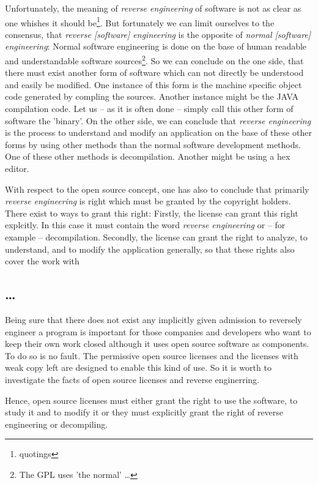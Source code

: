 Unfortunately, the meaning of \emph{reverse engineering} of software is not as
clear as one whishes it should be\footnote{quotings}. But fortunately we can
limit ourselves to the consensus, that \emph{reverse [software] engineering} is
the opposite of \emph{normal [software] engineering}: Normal software
engineering is done on the base of human readable and understandable software
sources\footnote{The GPL uses 'the normal' \ldots}. So we can conclude on the
one side, that there must exist another form of software which can not directly be
understood and easily be modified. One instance of this form is the machine
specific object code generated by compling the sources. Another instance might
be the JAVA compilation code. Let us -- as it is often done -- simply call this
other form of software the 'binary'. On the other side, we can conclude that
\emph{reverse engineering} is the process to understand and modify an application on the base of these other forms by using other methods than the normal software development
methods. One of these other methods is decompilation. Another might be using a
hex editor.

With respect to the open source concept, one has also to conclude that primarily
\emph{reverse engineering} is right which must be granted by the copyright
holders. There exist to ways to grant this right: Firstly, the license can grant
this right explcitly. In this case it must contain the word \emph{reverse
engineering} or -- for example -- decompilation. Secondly, the license can grant
the right to analyze, to understand, and to modify the application generally, so
that these rights also cover the work with

\subsection{\ldots}

Being sure that there does not exist any implicitly given admission to reversely
engineer a program is important for those companies and developers who want to
keep their own work closed although it uses open source software as components.
To do so is no fault. The permissive open source licenses and the licenses with
weak copy left are designed to enable this kind of use. So it is worth to
investigate the facts of open source licenses and reverse enginerring.



Hence, open source licenses must either grant the right to use the software, to
study it and to modify it or they must explicitly grant the right of reverse
engineering or decompiling.

